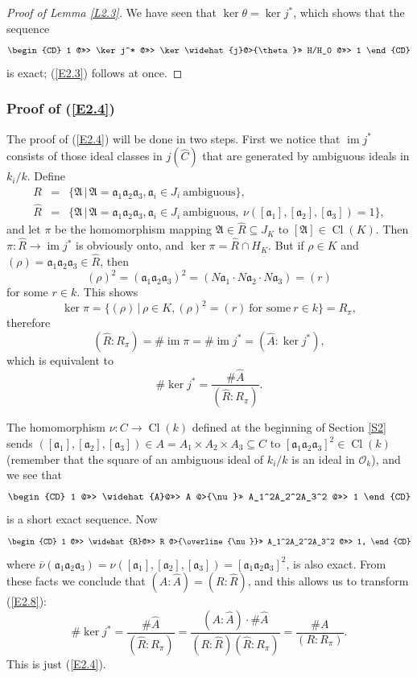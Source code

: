 \documentclass{amsart}
\newcommand{\fa}{{\mathfrak a}}
\newcommand{\fA}{{\mathfrak A}}
\newcommand{\OO}{{\mathcal O}}
\newcommand{\hj}{\widehat{j}}
\newcommand{\hA}{\widehat{A}}
\newcommand{\hC}{\widehat{C}}
\newcommand{\hR}{\widehat{R}}
\newcommand{\sth}{\,|\,}
\newcommand{\bnu}{\overline{\nu}}
\newcommand{\Cl}{\operatorname{Cl}}
\newcommand{\lra}{\longrightarrow}
\newcommand{\im}{\operatorname{im}}
\begin{document}
\begin{proof}[Proof of Lemma \ref{L2.3}]
We have seen that $\ker \theta = \ker j^*$, which shows
that the sequence
$$ \begin{CD}
  1 @>>> \ker j^* @>>> \ker \hj @>{\theta}>> H/H_0 @>>> 1
  \end{CD} $$
is exact; (\ref{E2.3}) follows at once.
\end{proof}

\subsubsection*{Proof of (\ref{E2.4})}
The proof of (\ref{E2.4}) will be done in two steps. First we
notice that $\im j^*$ consists of those ideal classes
in $j(\hC)$ that are generated by ambiguous ideals in $k_i/k$.
Define
\begin{eqnarray*}
   R  & = & \{ \fA \sth \fA = \fa_1 \fa_2 \fa_3, \fa_i \in J_i
  \ \text{ambiguous}\}, \\
  \hR & = & \{ \fA \sth \fA = \fa_1 \fa_2 \fa_3, \fa_i \in J_i
  \ \text{ambiguous},\ \nu([\fa_1], [\fa_2], [\fa_3]) = 1\},
\end{eqnarray*}
and let $\pi$ be the homomorphism mapping $\fA \in \hR \subseteq J_K$
to $[\fA] \in \Cl(K)$. Then $\pi: \hR \lra \im j^*$ is obviously
onto, and $\ker \pi = \hR \cap H_K$. But if $\rho \in K$ and
$(\rho) = \fa_1\fa_2\fa_3 \in \hR$, then
$$ (\rho)^2 = (\fa_1\fa_2\fa_3)^2 =
    (N\fa_1 \cdot N\fa_2 \cdot N\fa_3) = (r)$$
for some $r \in k$. This shows
$$ \ker \pi = \{(\rho) \sth \rho \in K, (\rho)^2 = (r) \
   \text{for some}\ r \in k\} = R_\pi,$$
therefore
$$ (\hR : R_\pi) = \# \im \pi = \# \im j^* = (\hA : \ker j^*),$$
which is equivalent to
\begin{equation}\label{E2.8}
 \# \ker j^* = \frac{\# \hA}{(\hR : R_\pi)}.
\end{equation}

The homomorphism $\nu: C \lra \Cl(k)$ defined at the beginning
of Section \ref{S2} sends
$([\fa_1], [\fa_2], [\fa_3]) \in A = A_1 \times A_2 \times A_3
  \subseteq C$ to $[\fa_1\fa_2\fa_3]^2 \in \Cl(k)$ (remember
that the square of an ambiguous ideal of $k_i/k$ is an ideal
in $\OO_k$), and we see that
$$ \begin{CD}
   1 @>>> \hA @>>> A @>{\nu}>> A_1^2A_2^2A_3^2 @>>> 1
   \end{CD} $$
is a short exact sequence. Now
$$ \begin{CD}
   1 @>>> \hR @>>> R @>{\bnu}>> A_1^2A_2^2A_3^2 @>>> 1,
   \end{CD} $$
where $\bnu(\fa_1\fa_2\fa_3) = \nu([\fa_1], [\fa_2], [\fa_3])
  = [\fa_1\fa_2\fa_3]^2$, is also exact.
From these facts we conclude that $(A:\hA) = (R:\hR)$, and
this allows us to transform (\ref{E2.8}):
$$ \# \ker j^* = \frac{\# \hA}{(\hR:R_\pi)} =
   \frac{(A:\hA) \cdot \# \hA}{(R:\hR)(\hR:R_\pi)} =
   \frac{\# A}{(R:R_\pi)}. $$
This is just (\ref{E2.4}).
\end{document}

